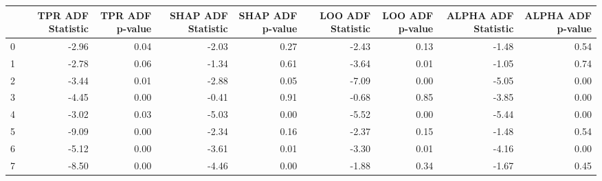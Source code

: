 \begin{tabular}{lrrrrrrrr}
\toprule
 & TPR ADF Statistic & TPR ADF p-value & SHAP ADF Statistic & SHAP ADF p-value & LOO ADF Statistic & LOO ADF p-value & ALPHA ADF Statistic & ALPHA ADF p-value \\
\midrule
0 & -2.96 & 0.04 & -2.03 & 0.27 & -2.43 & 0.13 & -1.48 & 0.54 \\
1 & -2.78 & 0.06 & -1.34 & 0.61 & -3.64 & 0.01 & -1.05 & 0.74 \\
2 & -3.44 & 0.01 & -2.88 & 0.05 & -7.09 & 0.00 & -5.05 & 0.00 \\
3 & -4.45 & 0.00 & -0.41 & 0.91 & -0.68 & 0.85 & -3.85 & 0.00 \\
4 & -3.02 & 0.03 & -5.03 & 0.00 & -5.52 & 0.00 & -5.44 & 0.00 \\
5 & -9.09 & 0.00 & -2.34 & 0.16 & -2.37 & 0.15 & -1.48 & 0.54 \\
6 & -5.12 & 0.00 & -3.61 & 0.01 & -3.30 & 0.01 & -4.16 & 0.00 \\
7 & -8.50 & 0.00 & -4.46 & 0.00 & -1.88 & 0.34 & -1.67 & 0.45 \\
\bottomrule
\end{tabular}
